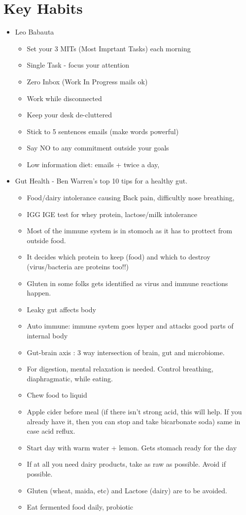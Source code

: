 \section{Key Habits}
\begin{itemize}[noitemsep,nolistsep]
\item Leo Babauta
	\begin{itemize}[noitemsep,nolistsep]
	\item Set your 3 MITs (Most Imprtant Tasks) each morning
	\item Single Task - focus your attention
	\item Zero Inbox (Work In Progress mails ok)
	\item Work while disconnected
	\item Keep your desk de-cluttered
	\item Stick to 5 sentences emails (make words powerful)
	\item Say NO to any commitment outside your goals
	\item Low information diet: emails + twice a day, 
	\end{itemize}

\item Gut Health - Ben Warren's top 10 tips for a healthy gut.
	\begin{itemize}[noitemsep,nolistsep]
	\item Food/dairy intolerance causing Back pain, difficultly nose breathing, 
	\item IGG IGE test for whey protein, lactose/milk intolerance
	\item Most of the immune system is in stomoch as it has to prottect from outside food.
	\item It decides which protein to keep (food) and which to destroy (virus/bacteria are proteins too!!)
	\item Gluten in some folks gets identified as virus and immune reactions happen.
	\item Leaky gut affects body
	\item Auto immune: immune system goes hyper and attacks good parts of internal body
	\item Gut-brain axis : 3 way intersection of brain, gut and microbiome.
	\item For digestion, mental relaxation is needed. Control breathing, diaphragmatic, while eating.
	\item Chew food to liquid
	\item Apple cider before meal (if there isn't strong acid, this will help. If you already have it, then you can stop and take bicarbonate soda) same in case acid reflux.
	\item Start day with warm water + lemon. Gets stomach ready for the day
	\item If at all you need dairy products, take as raw as possible. Avoid if possible.
	\item Gluten (wheat, maida, etc) and Lactose (dairy) are to be avoided.
	\item Eat fermented food daily, probiotic
	\end{itemize}
	

\end{itemize}
